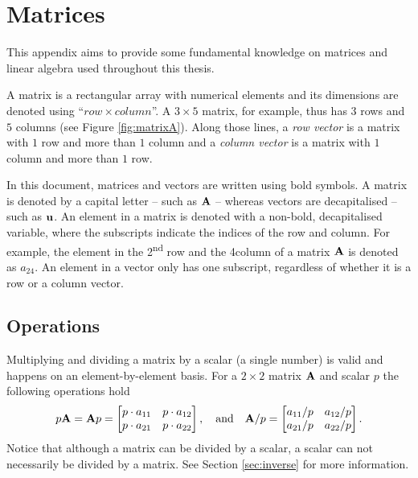 \chapter{Matrices}\label{app:matrices}
This appendix aims to provide some fundamental knowledge on matrices and linear algebra used throughout this thesis. 

A matrix is a rectangular array with numerical elements and its dimensions are denoted using ``$row \times column$''. A $3\times 5$ matrix, for example, thus has $3$ rows and $5$ columns (see Figure \ref{fig:matrixA}). Along those lines, a \textit{row vector} is a matrix with $1$ row and more than $1$ column and a \textit{column vector} is a matrix with $1$ column and more than $1$ row.

In this document, matrices and vectors are written using bold symbols. %
A matrix is denoted by a capital letter -- such as $\mathbf{A}$ -- whereas vectors are decapitalised -- such as $\mathbf{u}$. An element in a matrix is denoted with a non-bold, decapitalised variable, where the subscripts indicate the indices of the row and column. For example, the element in the 2\textsuperscript{nd} row and the 4\th column of a matrix $\mathbf{A}$ is denoted as $a_{24}$. An element in a vector only has one subscript, regardless of whether it is a row or a column vector.

\section{Operations}
Multiplying and dividing a matrix by a scalar (a single number) is valid and happens on an element-by-element basis. For a $2\times 2$ matrix $\mathbf{A}$ and scalar $p$ the following operations hold
\begin{equation*}
        p \mathbf{A} = \mathbf{A} p = \begin{bmatrix}
        p\cdot a_{11}& p\cdot a_{12}\\
        p\cdot a_{21} & p\cdot a_{22}
    \end{bmatrix}, \quad \text{and} \quad \mathbf{A} / p= \begin{bmatrix}
            a_{11}/p& a_{12}/p\\
            a_{21}/p & a_{22}/p
    \end{bmatrix}.
\end{equation*}
Notice that although a matrix can be divided by a scalar, a scalar can not necessarily be divided by a matrix. See Section \ref{sec:inverse} for more information.

